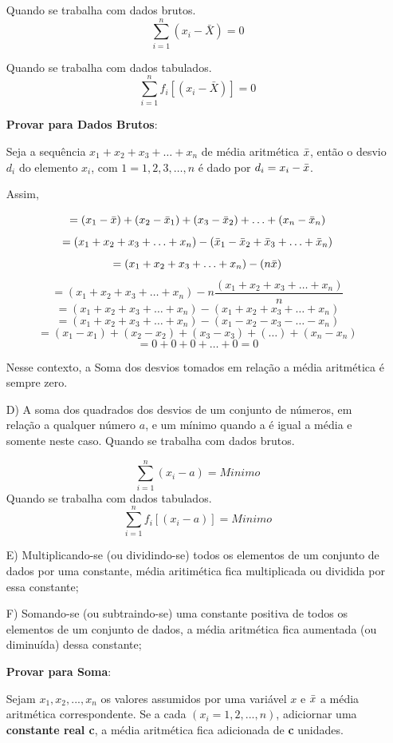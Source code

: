 \begin{enumerate}
Quando se trabalha com dados brutos.
$$ \sum_{i=1}^{n}(x_{i}-\bar{X})=0 $$


Quando se trabalha com dados tabulados.
$$ \sum_{i=1}^{n}f_{i}[(x_{i}-\bar{X})]=0 $$



\textbf{Provar para Dados Brutos}: 
\vskip0.3cm

Seja a sequência  $x_{1}+x_{2}+x_{3}+\ldots+x_{n}$ de média aritmética $\Bar{x}$, então o desvio $d_{i}$ do elemento $x_{i}$, com $1=1,2,3,\ldots,n$ é dado por $d_{i}=x_{i}-\Bar{x}$.
\vskip0.3cm


Assim, 

$$=(x_{1}-\Bar{x})+(x_{2}-\Bar{x}_{1})+(x_{3}-\Bar{x}_{2})+\ldots+(x_{n}-\Bar{x}_{n})$$
$$=(x_{1}+x_{2}+x_{3}+\ldots+x_{n}) - (\Bar{x}_{1}-\Bar{x}_{2}+\Bar{x}_{3}+\ldots+\Bar{x}_{n})$$
$$=(x_{1}+x_{2}+x_{3}+\ldots+x_{n})-(n\Bar{x})$$
$$=(x_{1}+x_{2}+x_{3}+\ldots+x_{n})-n\frac{(x_{1}+x_{2}+x_{3}+\ldots+x_{n})}{n}$$
$$=(x_{1}+x_{2}+x_{3}+\ldots+x_{n})-(x_{1}+x_{2}+x_{3}+\ldots+x_{n})$$
$$=(x_{1}+x_{2}+x_{3}+\ldots+x_{n})-(x_{1}-x_{2}-x_{3}-\ldots-x_{n})$$
$$=(x_{1}-x_{1})+(x_{2}-x_{2})+(x_{3}-x_{3})+(\ldots)+(x_{n}-x_{n})$$
$$=0+0+0+\ldots+0=0$$

Nesse contexto, a Soma dos desvios tomados em relação a média aritmética é sempre zero.

\item [{D)}] A soma dos quadrados dos desvios de um conjunto de números, em relação a qualquer número $a$, e um mínimo quando a é igual a média e somente neste caso.\vskip0.3cm
Quando se trabalha com dados brutos.

$$ \sum_{i=1}^{n}(x_{i}- a)= Minimo  $$
Quando se trabalha com dados tabulados.
$$ \sum_{i=1}^{n}f_{i}[(x_{i}- a)]= Minimo  $$

  \item [{E)}] Multiplicando-se (ou dividindo-se) todos os elementos
de um conjunto de dados por uma constante, média aritimética fica multiplicada ou dividida por essa constante;


\item [{F)}] Somando-se (ou subtraindo-se) uma constante positiva de todos os elementos de um conjunto de dados, a média aritmética fica aumentada (ou diminuída) dessa constante;

\vskip0.3cm
\textbf{Provar para Soma}: 
\vskip0.3cm

Sejam $x_{1}, x_{2},...,x_{n}$ os valores assumidos por uma variável $x$ e $\Bar{x}$ a média aritmética correspondente. Se a cada $(x_{i}=1,2,...,n)$, adiciornar uma \textbf{constante real c}, a média aritmética fica adicionada de \textbf{c} unidades.\vskip0.3cm


\end{enumerate}
